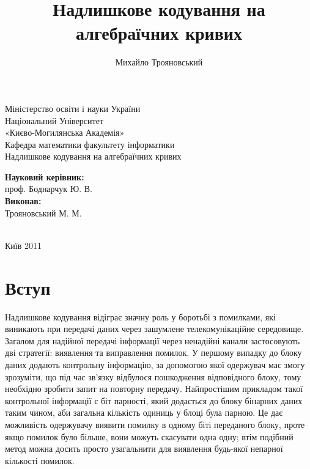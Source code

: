 \documentclass[a4paper,14pt,oneside]{extarticle}
\title{Надлишкове кодування на алгебраїчних кривих}
\author{Михайло Трояновський}
\begin{document}
\begin{titlepage}
\begin{center}
    Міністерство освіти і науки України\\
Національний Університет\\ «Києво-Могилянська Академія»\\
        Кафедра математики факультету інформатики\\
        \vskip 3cm
                               \vskip 3cm
{\Large
        Надлишкове кодування на алгебраїчних кривих
}
\vskip 4cm
\textwidth
\begin{minipage}{0.5\textwidth}
        \textbf{Науковий керівник:}\\
        проф. Боднарчук Ю. В.\\
\textbf{Виконав:}\\
        Трояновський М. М.\\
        \\
        \end{minipage}
        \vfill
        Київ 2011
        \end{center}
        \end{titlepage}


\tableofcontents
\pagebreak

\section*{Вступ}
Надлишкове кодування відіграє значну роль у боротьбі з помилками, які виникають при передачі даних через зашумлене телекомунікаційне середовище. 
Загалом для надійної передачі інформації через ненадійні канали застосовують дві стратегії: виявлення та виправлення помилок. 
У першому випадку до блоку даних додають контрольну інформацію, за допомогою якої одержувач має змогу зрозуміти, 
що під час зв'язку відбулося пошкодження відповідного блоку, тому необхідно зробити запит на повторну передачу. 
Найпростішим прикладом такої контрольної інформації є біт парності, який додається до блоку бінарних даних таким чином, аби загальна кількість одиниць у блоці була парною. 
Це дає можливість одержувачу виявити помилку в одному біті переданого блоку, проте якщо помилок було більше, вони можуть скасувати одна одну; 
втім подібний метод можна досить просто узагальнити для виявлення будь-якої непарної кількості помилок.
\end{document}
